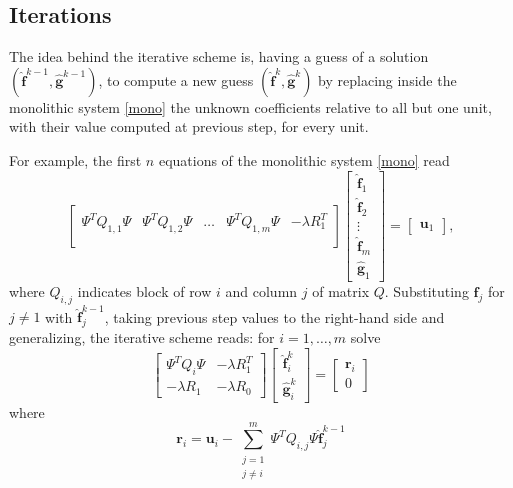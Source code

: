 \subsection{Iterations}
\label{iterburocratico}
The idea behind the iterative scheme is, having a guess of a solution
$(\hat{\bm{f}}^{k-1},\hat{\bm{g}}^{k-1})$, to compute a new guess
$(\hat{\bm{f}}^k,\hat{\bm{g}}^k)$ by replacing inside the monolithic system
\ref{mono} the unknown coefficients relative to all but one unit, with their
value computed at previous step, for every unit.

For example, the first $n$ equations of the monolithic system \ref{mono} read
\begin{equation}
	\begin{bmatrix}
		\Psi^TQ_{1,1}\Psi & \Psi^TQ_{1,2}\Psi & \dots & \Psi^TQ_{1,m}\Psi & -\lambda R_1^T \\
	\end{bmatrix}
	\begin{bmatrix}
		\hat{\bm{f}}_1 \\
		\hat{\bm{f}}_2 \\
		\vdots         \\
		\hat{\bm{f}}_m \\
		\hat{\bm{g}}_1
	\end{bmatrix}
	=
	\begin{bmatrix}
		\bm{u}_1
	\end{bmatrix}
	,
\end{equation}
where $Q_{i,j}$ indicates block of row $i$ and column $j$ of matrix
$Q$. Substituting $\hat{\bm{f}}_j$ for $j \neq 1$ with $\hat{\bm{f}}_j^{k-1}$,
taking previous step values to the right-hand side and generalizing, the
iterative scheme reads: for $i = 1, \dots, m$ solve
\begin{equation}
	\begin{bmatrix}
		\Psi^TQ_i\Psi & -\lambda R_1^T \\
		-\lambda R_1  & -\lambda R_0
	\end{bmatrix}
	\begin{bmatrix}
		\hat{\bm{f}}_i^k \\
		\hat{\bm{g}}_i^k
	\end{bmatrix}
	=
	\begin{bmatrix}
		\bm{r}_i \\
		0
	\end{bmatrix}
\end{equation}
where
\begin{equation}
	\bm{r}_i =\bm{u}_i -\sum_{\substack{j=1\\ j\neq i}}^m \Psi^TQ_{i,j} \Psi \hat{\bm{f}}_j^{k-1}
\end{equation}

